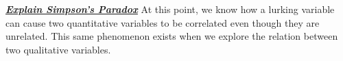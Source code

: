 \documentclass{report}
\begin{document}
    \bigbreak \noindent \bigbreak \noindent 
    \textbf{\textit{\underline{Explain Simpson's Paradox}}}
    \bigbreak \noindent 
    At this point, we know how a lurking variable can cause two quantitative variables to be correlated even though they are unrelated. This same phenomenon exists when we explore the relation between two qualitative variables.














    
\end{document}
